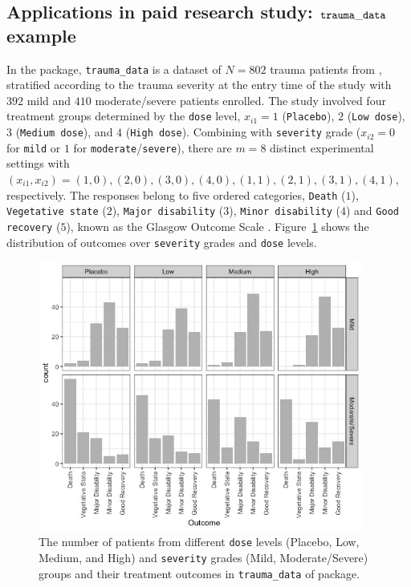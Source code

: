 \subsection{Applications in paid research study: $\tt trauma\_data$ example}\label{sec:MLM_example}
In the  package, \texttt{trauma\_data} is a dataset of $N=802$ trauma patients from \cite{chuang1997}, stratified according to the trauma severity at the entry time of the study with $392$ mild and $410$ moderate/severe patients enrolled. The study involved four treatment groups determined by the {\tt dose} level, $x_{i1} = 1$ ({\tt Placebo}), $2$ ({\tt Low dose}), $3$ ({\tt Medium dose}), and $4$ ({\tt High dose}). Combining with {\tt severity} grade ($x_{i2} = 0$ for {\tt mild} or $1$ for {\tt moderate}/{\tt severe}), there are $m=8$ distinct experimental settings with $(x_{i1}, x_{i2}) = (1,0), (2,0), (3,0), (4,0), (1,1), (2,1), (3,1), (4,1)$, respectively. The responses belong to five ordered categories, {\tt Death} ($1$), {\tt Vegetative state} ($2$), {\tt Major disability} ($3$), {\tt Minor disability} ($4$) and {\tt Good} {\tt recovery} ($5$), known as the Glasgow Outcome Scale \citep{jennett1975}. Figure~\ref{fig:trauma_data} shows the distribution of outcomes over {\tt severity} grades and {\tt dose} levels.
\begin{figure}[htb!]
    \centering
    \includegraphics[width=0.95\textwidth]{figures/trauma_data.png}
    \caption{The number of patients from different {\tt dose} levels (Placebo, Low, Medium, and High) and {\tt severity} grades (Mild, Moderate/Severe) groups and their treatment outcomes in \texttt{trauma\_data} of  package.}
    \label{fig:trauma_data}
\end{figure}
